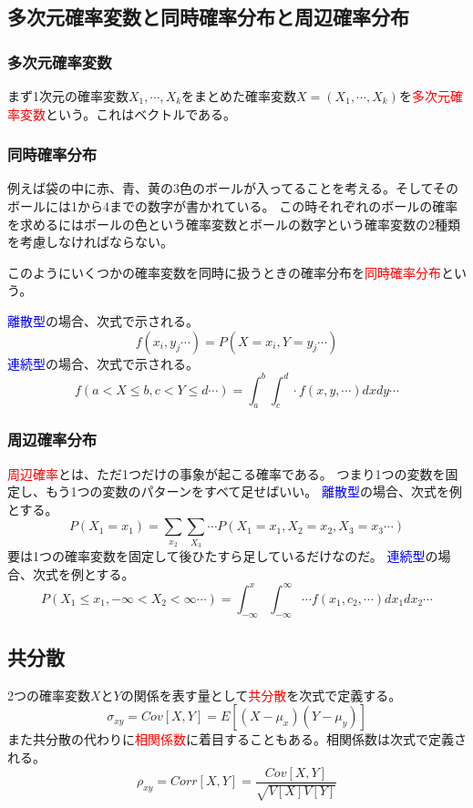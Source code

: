\documentclass[a4paper,10pt]{jarticle}
\begin{document}
\subsection{多次元確率変数と同時確率分布と周辺確率分布}
\subsubsection{多次元確率変数}
まず1次元の確率変数$X_1,\cdots,X_k$をまとめた確率変数$X=(X_1,\cdots,X_k)$を\textcolor{red}{多次元確率変数}という。これはベクトルである。
\subsubsection{同時確率分布}
例えば袋の中に赤、青、黄の3色のボールが入ってることを考える。そしてそのボールには1から4までの数字が書かれている。
この時それぞれのボールの確率を求めるにはボールの色という確率変数とボールの数字という確率変数の2種類を考慮しなければならない。

このようにいくつかの確率変数を同時に扱うときの確率分布を\textcolor{red}{同時確率分布}という。

\textcolor{blue}{離散型}の場合、次式で示される。
\begin{equation}
    f(x_i,y_j\cdots)=P(X=x_i,Y=y_j\cdots)\tag{2,14}
\end{equation}
\textcolor{blue}{連続型}の場合、次式で示される。
\begin{equation}
    f(a<X\leq b,c<Y\leq d\cdots)=\int_a^b\int_c^d\cdot f(x,y,\cdots) dxdy\cdots\tag{2,15}
\end{equation}
\subsubsection{周辺確率分布}
\textcolor{red}{周辺確率}とは、ただ1つだけの事象が起こる確率である。
つまり1つの変数を固定し、もう1つの変数のパターンをすべて足せばいい。
\textcolor{blue}{離散型}の場合、次式を例とする。
\begin{equation}
    P(X_1=x_1)=\sum_{x_2}\sum_{X_3}\cdots P(X_1 = x_1,X_2 = x_2, X_3 = x_3\cdots)\tag{2,16}
\end{equation}
要は1つの確率変数を固定して後ひたすら足しているだけなのだ。
\textcolor{blue}{連続型}の場合、次式を例とする。
\begin{equation}
    P(X_1\leq x_1,-\infty < X_2 < \infty \cdots) = \int_{-\infty}^x\int_{-\infty}^\infty\cdots f(x_1,c_2,\cdots)dx_1dx_2\cdots\tag{2,17}
\end{equation}
\subsection{共分散}
2つの確率変数$X$と$Y$の関係を表す量として\textcolor{red}{共分散}を次式で定義する。
\begin{equation}
    \sigma_{xy}=Cov[X,Y]=E[(X-\mu_x)(Y-\mu_y)] \tag{2,18}
\end{equation}
また共分散の代わりに\textcolor{red}{相関係数}に着目することもある。相関係数は次式で定義される。
\begin{equation}
    \rho_{xy} = Corr[X,Y] = \frac{Cov[X,Y]}{\sqrt{V[X]V[Y]}}\tag{2,19}
\end{equation}
\end{document}
